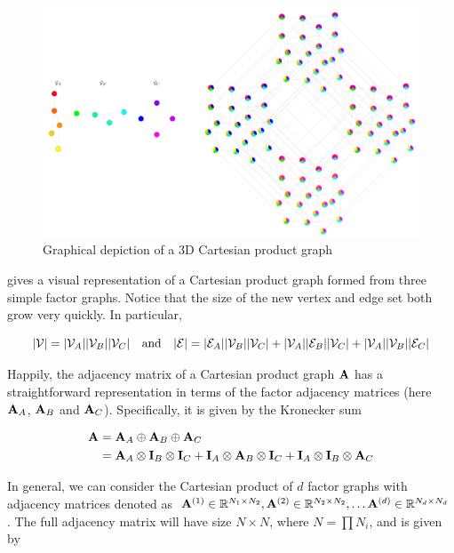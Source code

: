 \begin{figure}[t]
    \begin{center}
        \includegraphics[width=\linewidth]{Figures/3D_CPG.pdf}
    \end{center}
    \caption[Graphical depiction of a 3D Cartesian product graph]{Graphical depiction of a 3D Cartesian product graph}
    \label{fig:3D_CPG}
\end{figure}

 gives a visual representation of a Cartesian product graph formed from three simple factor graphs. Notice that the size of the new vertex and edge set both grow very quickly. In particular, 

$$
|\mathcal{V}| = |\mathcal{V}_A| |\mathcal{V}_B| |\mathcal{V}_C| \quad \text{and} \quad |\mathcal{E}| =  |\mathcal{E}_A| |\mathcal{V}_B| |\mathcal{V}_C| + |\mathcal{V}_A| |\mathcal{E}_B| |\mathcal{V}_C| + |\mathcal{V}_A| |\mathcal{V}_B| |\mathcal{E}_C|
$$

Happily, the adjacency matrix of a Cartesian product graph $\mathbf{A}$ has a straightforward representation in terms of the factor adjacency matrices (here $\mathbf{A}_A$, $\mathbf{A}_B$ and $\mathbf{A}_C$). Specifically, it is given by the Kronecker sum

\begin{align}
    \mathbf{A} &= \mathbf{A}_A \oplus \mathbf{A}_B \oplus \mathbf{A}_C \notag \\
    &= \mathbf{A}_A \otimes \mathbf{I}_B \otimes \mathbf{I}_C  + \mathbf{I}_A \otimes \mathbf{A}_B \otimes \mathbf{I}_C + \mathbf{I}_A \otimes \mathbf{I}_B \otimes \mathbf{A}_C
\end{align}

In general, we can consider the Cartesian product of $d$ factor graphs with adjacency matrices denoted as $\mathbf{A}^{(1)} \in \mathbb{R}^{N_1 \times N_2}, \mathbf{A}^{(2)} \in \mathbb{R}^{N_2 \times N_2}, \dots \mathbf{A}^{(d)} \in \mathbb{R}^{N_d \times N_d}$. The full adjacency matrix will have size $N \times N$, where $N = \prod N_i$, and is given by  

